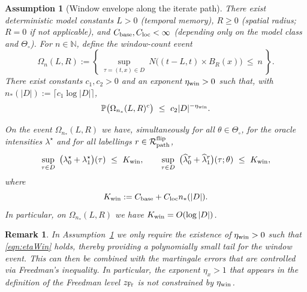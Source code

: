 \documentclass{statsoc}
\newtheorem{assumption}[assumption]{Assumption}
\newtheorem{remark}[remark]{Remark}
\newcommand{\bbP}{\mathbb{P}}
\newcommand{\1}{\mathbbm{1}}
\newcommand{\bbN}{\mathbb{N}}
\begin{document}
\begin{assumption}[Window envelope along the iterate path]\label{ass:G2prime}
There exist deterministic model constants $L>0$ (temporal memory), $R\ge 0$ (spatial radius; $R=0$ if not applicable), and $C_{\rm base},C_{\rm loc}<\infty$ (depending only on the model class and $\Theta_\circ$). For $n\in\bbN$, define the window-count event
\[
\Omega_{n}(L,R):=\left\{\ \sup_{\tau=(t,x)\in D}\ N\Big( (t-L,t)\times B_R(x) \Big)\ \le\ n\ \right\}.
\]
There exist constants $c_1,c_2>0$ and an exponent $\eta_{\rm win}>0$ such that, with $n_*(|D|):=\lceil c_1\log|D|\rceil$,
\begin{equation}\label{eqn:etaWin}
    \bbP\big(\Omega_{n_*}(L,R)^c\big)\ \le\ c_2 |D|^{-\eta_{\rm win}}. 
\end{equation}

On the event $\Omega_{n_*}(L,R)$ we have, simultaneously for all $\theta\in\Theta_\circ$, for the oracle intensities $\lambda^\star$ and for all labellings $r\in \mathcal R_{\rm path}^{\rm flip}$,
\[
\sup_{\tau\in D}\ \big(\lambda_0^\star+\lambda_1^\star\big)(\tau)\ \le\ K_{\rm win},\qquad
\sup_{\tau\in D}\ \big(\widehat\lambda_0^r+\widehat\lambda_1^r\big)(\tau;\theta)\ \le\ K_{\rm win},
\]
where
\[
K_{\rm win}:=C_{\rm base}+C_{\rm loc} n_*(|D|).
\]
In particular, on $\Omega_{n_*}(L,R)$ we have $K_{\rm win}=O(\log|D|)$.
\end{assumption}

\begin{remark}
In Assumption~\ref{ass:G2prime} we only require the existence of $\eta_{\rm win}>0$ such that \cref{eqn:etaWin} holds, thereby providing a polynomially small tail for the window event. This can then be combined with the martingale errors that are controlled  via Freedman's inequality. In particular, the exponent $\eta_x>1$ that appears in the definition of the Freedman level $z_{\rm Fr}$ is not constrained by $\eta_{\rm win}$.
\end{remark}
\end{document}
